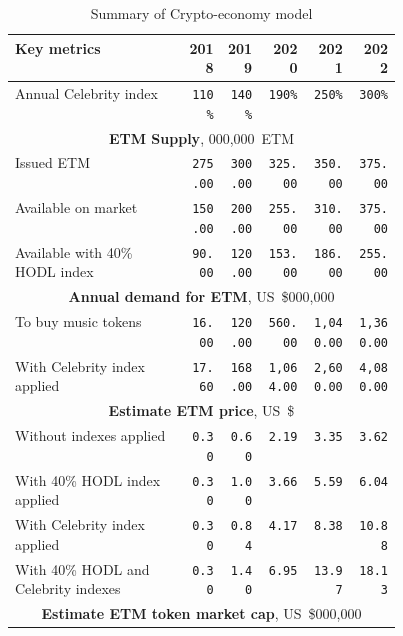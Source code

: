 \documentclass[12pt]{report}
\begin{document}
\begin{table}[H]
\centering
\caption{Summary of Crypto-economy model}
\begin{tabular}{p{0.45\linewidth}rrrrr}
\toprule
Key metrics & 2018 & 2019 & 2020 & 2021 & 2022 \\
\bottomrule

Annual Celebrity index & 
\texttt{110\%} & \texttt{140\%} & \texttt{190\%} & \texttt{250\%} & \texttt{300\%}\\

\midrule
\multicolumn{6}{c}{\textbf{ETM Supply}, 000,000~ETM} \\
\midrule
Issued ETM & 
\texttt{275.00} & \texttt{300.00} & \texttt{325.00} & \texttt{350.00} & \texttt{375.00}\\
Available on market & 
\texttt{150.00} & \texttt{200.00} & \texttt{255.00} & \texttt{310.00} & \texttt{375.00}\\
Available with 40\% HODL index & 
\texttt{90.00} & \texttt{120.00} & \texttt{153.00} & \texttt{186.00} & \texttt{255.00} \\

\midrule
\multicolumn{6}{c}{\textbf{Annual demand for ETM}, US~\$000,000} \\
\midrule
To buy music tokens & 
\texttt{16.00} & \texttt{120.00} & \texttt{560.00} & \texttt{1,040.00} & \texttt{1,360.00} \\
With Celebrity index applied & 
\texttt{17.60} & \texttt{168.00} & \texttt{1,064.00} & \texttt{2,600.00} & \texttt{4,080.00} \\

\midrule
\multicolumn{6}{c}{\textbf{Estimate ETM price}, US~\$} \\
\midrule

Without indexes applied & 
\texttt{0.30} & \texttt{0.60} & \texttt{2.19} & \texttt{3.35} & \texttt{3.62} \\
With 40\% HODL index applied & 
\texttt{0.30} & \texttt{1.00} & \texttt{3.66} & \texttt{5.59} & \texttt{6.04} \\
With Celebrity index applied & 
\texttt{0.30} & \texttt{0.84} & \texttt{4.17} & \texttt{8.38} & \texttt{10.88} \\ With 40\% HODL and Celebrity indexes & 
\texttt{0.30} & \texttt{1.40} & \texttt{6.95} & \texttt{13.97} & \texttt{18.13} \\

\midrule
\multicolumn{6}{c}{\textbf{Estimate ETM token market cap}, US~\$000,000} \\
\midrule


\end{tabular}
\end{table}
\end{document}
